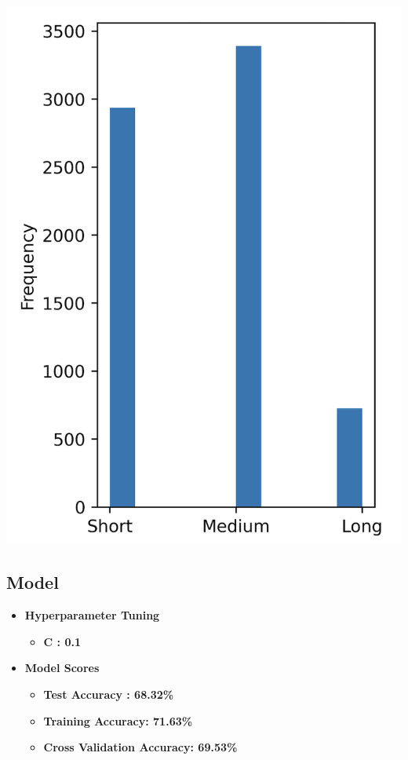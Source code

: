 \documentclass[
  letterpaper,
  DIV=11,
  numbers=noendperiod]{scrartcl}
\providecommand{\tightlist}{%
  \setlength{\itemsep}{0pt}\setlength{\parskip}{0pt}}\usepackage{longtable,booktabs,array}
\begin{document}
\begin{center}
\includegraphics{results/images/ReclassifiedLabels.png}
\end{center}

\subsection{Model}\label{model}

\begin{itemize}
\tightlist
\item
  \textbf{Hyperparameter Tuning}

  \begin{itemize}
  \tightlist
  \item
    \textbf{C : 0.1}
  \end{itemize}
\item
  \textbf{Model Scores}

  \begin{itemize}
  \tightlist
  \item
    \textbf{Test Accuracy : 68.32\%}
  \item
    \textbf{Training Accuracy: 71.63\%}
  \item
    \textbf{Cross Validation Accuracy: 69.53\%}
  \end{itemize}
\end{itemize}
\end{document}
